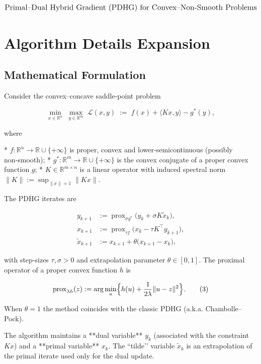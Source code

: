 \documentclass{article}
\begin{document}
\[
\text{\Large Primal–Dual Hybrid Gradient (PDHG) for Convex–Non‑Smooth Problems}
\]

\newpage
\section*{Algorithm Details Expansion}

\subsection*{Mathematical Formulation}
Consider the convex–concave saddle‑point problem  

\[
\min_{x\in\mathbb{R}^{n}} \; \max_{y\in\mathbb{R}^{m}} 
\;\mathcal{L}(x,y)\;:=\; f(x)+\langle Kx , y\rangle-g^{*}(y),
\tag{1}
\]

where  

* \(f:\mathbb{R}^{n}\rightarrow\mathbb{R}\cup\{+\infty\}\) is proper, convex and lower‑semicontinuous (possibly non‑smooth);  
* \(g^{*}:\mathbb{R}^{m}\rightarrow\mathbb{R}\cup\{+\infty\}\) is the convex conjugate of a proper convex function \(g\);  
* \(K\in\mathbb{R}^{m\times n}\) is a linear operator with induced spectral norm \(\|K\|:=\sup_{\|x\|=1}\|Kx\|\).

The PDHG iterates are

\[
\boxed{
\begin{aligned}
y_{k+1} &:= \operatorname{prox}_{\sigma g^{*}}\!\bigl(y_{k}+\sigma K\tilde{x}_{k}\bigr), \\[4pt]
x_{k+1} &:= \operatorname{prox}_{\tau f}\!\bigl(x_{k}-\tau K^{\top}y_{k+1}\bigr), \\[4pt]
\tilde{x}_{k+1} &:= x_{k+1}+ \theta\bigl(x_{k+1}-x_{k}\bigr),
\end{aligned}}
\tag{2}
\]

with step‑sizes \(\tau,\sigma>0\) and extrapolation parameter \(\theta\in[0,1]\).  
The proximal operator of a proper convex function \(h\) is  

\[
\operatorname{prox}_{\lambda h}(z):=\arg\min_{u}\Bigl\{h(u)+\frac{1}{2\lambda}\|u-z\|^{2}\Bigr\}.
\tag{3}
\]

When \(\theta=1\) the method coincides with the classic PDHG (a.k.a. Chambolle–Pock).  

The algorithm maintains a **dual variable** \(y_{k}\) (associated with the constraint \(Kx\)) and a **primal variable** \(x_{k}\).  
The “tilde’’ variable \(\tilde{x}_{k}\) is an extrapolation of the primal iterate used only for the dual update.
\end{document}
